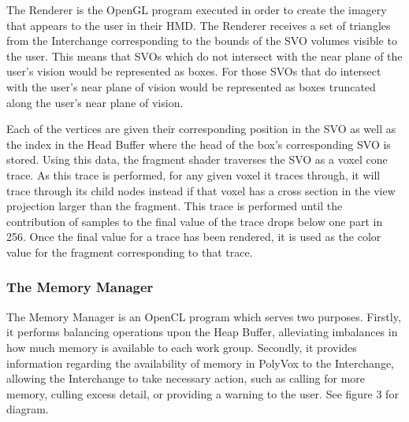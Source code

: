 \documentclass[onecolumn, draftclsnofoot,10pt, compsoc]{IEEEtran}
\begin{document}
The Renderer is the OpenGL program executed in order to create the imagery that appears to the user in their HMD. The Renderer receives a set of triangles from the Interchange corresponding to the bounds of the SVO volumes visible to the user. This means that SVOs which do not intersect with the near plane of the user’s vision would be represented as boxes. For those SVOs that do intersect with the user’s near plane of vision would be represented as boxes truncated along the user’s near plane of vision.

Each of the vertices are given their corresponding position in the SVO as well as the index in the Head Buffer where the head of the box’s corresponding SVO is stored. Using this data, the fragment shader traverses the SVO as a voxel cone trace. As this trace is performed, for any given voxel it traces through, it will trace through its child nodes instead if that voxel has a cross section in the view projection larger than the fragment. This trace is performed until the contribution of samples to the final value of the trace drops below one part in 256. Once the final value for a trace has been rendered, it is used as the color value for the fragment corresponding to that trace.\\

\subsubsection{The Memory Manager}

The Memory Manager is an OpenCL program which serves two purposes. Firstly, it performs balancing operations upon the Heap Buffer, alleviating imbalances in how much memory is available to each work group. Secondly, it provides information regarding the availability of memory in PolyVox to the Interchange, allowing the Interchange to take necessary action, such as calling for more memory, culling excess detail, or providing a warning to the user. See figure 3 for diagram.
\end{document}
